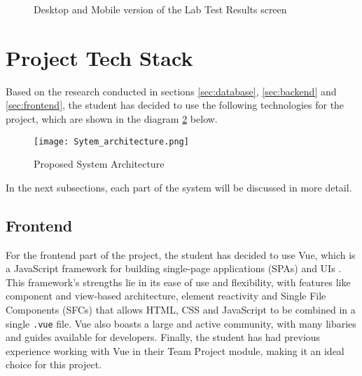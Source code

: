 \begin{figure}[ht]
    \centering
    \begin{minipage}[c]{0.70\textwidth}
    \end{minipage}
    \hspace{0.05\textwidth}
    \begin{minipage}[c]{0.20\textwidth}
    \end{minipage}
    \caption{Desktop and Mobile version of the Lab Test Results screen}
    \label{fig:lab}
\end{figure}

\section{Project Tech Stack}
\label{sec:techstack}

Based on the research conducted in sections \ref{sec:database}, \ref{sec:backend} and \ref{sec:frontend}, the student has decided to use the following technologies for the project, which are shown in the diagram \ref{fig:architecture} below.

\begin{figure}[htbp]
    \centering
    \texttt{[image: Sytem\_architecture.png]}
    \caption{Proposed System Architecture}
    \label{fig:architecture}
\end{figure}

In the next subsections, each part of the system will be discussed in more detail.

\subsection{Frontend}

For the frontend part of the project, the student has decided to use Vue, which is a JavaScript framework for building single-page applications (SPAs) and UIs \parencite{vue}. This framework's strengths lie in its ease of use and flexibility, with features like component and view-based architecture, element reactivity and Single File Components (SFCs) that allows HTML, CSS and JavaScript to be combined in a single \lstinline{.vue} file. Vue also boasts a large and active community, with many libaries and guides available for developers. Finally, the student has had previous experience working with Vue in their Team Project module, making it an ideal choice for this project.

